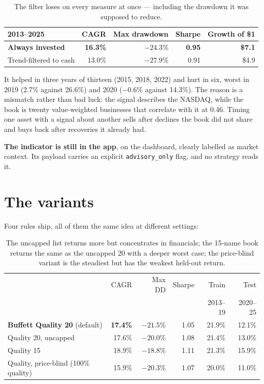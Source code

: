\documentclass[11pt,a4paper]{article}
\begin{document}
\begin{table}[!ht]
\centering\sffamily\small
\begin{tabular}{lrrrr}
\toprule
2013--2025 & CAGR & Max drawdown & Sharpe & Growth of \$1 \\
\midrule
\textbf{Always invested} & \textbf{16.3\%} & $\mathbf{-24.3\%}$ & \textbf{0.95} & \textbf{\$7.1} \\
Trend-filtered to cash & 13.0\% & $-27.9\%$ & 0.91 & \$4.9 \\
\bottomrule
\end{tabular}
\caption{The filter loses on every measure at once --- including the drawdown
it was supposed to reduce.}
\end{table}

It helped in three years of thirteen (2015, 2018, 2022) and hurt in six, worst
in 2019 (2.7\% against 26.6\%) and 2020 ($-0.6\%$ against 14.3\%). The reason
is a mismatch rather than bad luck: the signal describes the NASDAQ, while the
book is twenty value-weighted businesses that correlate with it at 0.46. Timing
one asset with a signal about another sells after declines the book did not
share and buys back after recoveries it already had.

\textbf{The indicator is still in the app}, on the dashboard, clearly labelled
as market context. Its payload carries an explicit \texttt{advisory\_only}
flag, and no strategy reads it.

\section{The variants}\label{sec:variants}

Four rules ship, all of them the same idea at different settings:

\begin{table}[!ht]
\centering\sffamily\small
\begin{tabular}{lrrrrr}
\toprule
 & CAGR & Max DD & Sharpe & Train & Test \\
 & & & & 2013--19 & 2020--25 \\
\midrule
\textbf{Buffett Quality 20} (default) & \textbf{17.4\%} & $-21.5\%$ & 1.05 & 21.9\% & 12.1\% \\
Quality 20, uncapped & 17.6\% & $-20.0\%$ & 1.08 & 21.4\% & 13.0\% \\
Quality 15 & 18.9\% & $-18.8\%$ & 1.11 & 21.3\% & 15.9\% \\
Quality, price-blind (100\% quality) & 15.9\% & $-20.3\%$ & 1.07 & 20.0\% & 11.0\% \\
\bottomrule
\end{tabular}
\caption{The uncapped list returns more but concentrates in financials; the
15-name book returns the same as the uncapped 20 with a deeper worst case; the
price-blind variant is the steadiest but has the weakest held-out return.}
\end{table}
\end{document}
